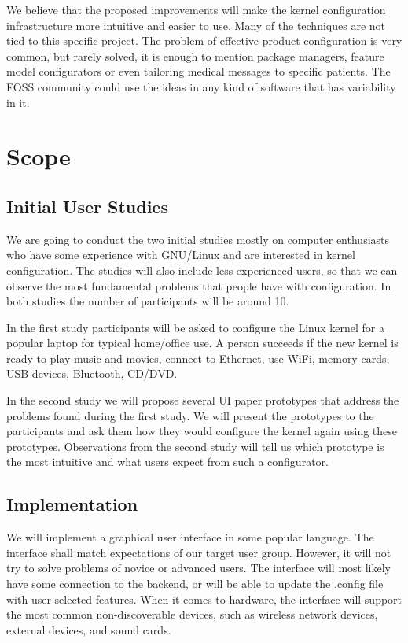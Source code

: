 \documentclass{chi2009}
\begin{document}
We believe that the proposed improvements will make the kernel configuration infrastructure more intuitive and easier to use. Many of the techniques are not tied to this specific project. The problem of effective product configuration is very common, but rarely solved, it is enough to mention package managers, feature model configurators or even tailoring medical messages to specific patients. The FOSS community could use the ideas in any kind of software that has variability in it.

\section{Scope}

\subsection{Initial User Studies}
We are going to conduct the two initial studies mostly on computer enthusiasts who have some experience with GNU/Linux and are interested in kernel configuration. The studies will also include less experienced users, so that we can observe the most fundamental problems that people have with configuration. In both studies the number of participants will be around 10.

In the first study participants will be asked to configure the Linux kernel for a popular laptop for typical home/office use. A person succeeds if the new kernel is ready to play music and movies, connect to Ethernet, use WiFi, memory cards, USB devices, Bluetooth, CD/DVD.

In the second study we will propose several UI paper prototypes that address the problems found during the first study. We will present the prototypes to the participants and ask them how they would configure the kernel again using these prototypes. Observations from the second study will tell us which prototype is the most intuitive and what users expect from such a configurator.

\subsection{Implementation}

We will implement a graphical user interface in some popular language. The interface shall match expectations of our target user group. However, it will not try to solve problems of novice or advanced users. The interface will most likely have some connection to the backend, or will be able to update the \textsf{.config} file with user-selected features. When it comes to hardware, the interface will support the most common non-discoverable devices, such as wireless network devices, external devices, and sound cards.
\end{document}
